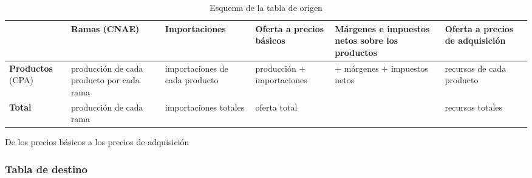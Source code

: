 \documentclass[11pt]{article}
\begin{document}
\begin{table}[H]
\centering
\caption{Esquema de la tabla de origen}\label{tab:origen}
\small
\setlength{\tabcolsep}{4pt}
\begin{tabular}{>{\centering\arraybackslash}m{1.8cm}>{\centering\arraybackslash}m{2.3cm}>{\centering\arraybackslash}m{1.7cm}>{\centering\arraybackslash}m{1.7cm}>{\centering\arraybackslash}m{2.2cm}>{\centering\arraybackslash}m{1.8cm}}
\toprule
\rowcolor{tceeazulpalido} & \textbf{Ramas} \newline (CNAE) & \textbf{Importa\-ciones} & \textbf{Oferta a precios básicos} & \textbf{Márgenes e impuestos netos sobre los productos} & \textbf{Oferta a precios de adquisición}\\
\midrule
\textbf{Productos} \newline (CPA) & \cellcolor{tceesalvia}producción de cada producto por cada rama & importa\-ciones de cada producto & producción $+$ importaciones & $+$ márgenes $+$ impuestos netos & recursos de cada producto\\
\addlinespace[0.3em]
\textbf{Total} & producción de cada rama & importa\-ciones totales & oferta total & & recursos totales\\
\bottomrule
\end{tabular}
\end{table}

\begin{infografia}[H]
\centering
\caption{De los precios básicos a los precios de adquisición}\label{figu:valoracion}
\end{infografia}

\subsubsection{Tabla de destino}\label{sec:destino}
\end{document}
